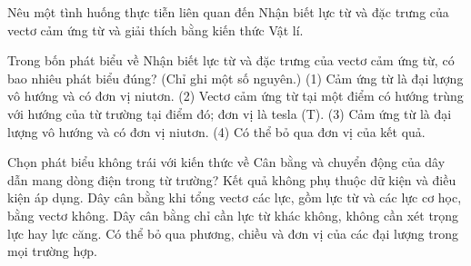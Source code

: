 \begin{bt}
Nêu một tình huống thực tiễn liên quan đến Nhận biết lực từ và đặc trưng của vectơ cảm ứng từ và giải thích bằng kiến thức Vật lí.
\end{bt}

\begin{ex}
Trong bốn phát biểu về Nhận biết lực từ và đặc trưng của vectơ cảm ứng từ, có bao nhiêu phát biểu đúng? (Chỉ ghi một số nguyên.) (1) Cảm ứng từ là đại lượng vô hướng và có đơn vị niutơn. (2) Vectơ cảm ứng từ tại một điểm có hướng trùng với hướng của từ trường tại điểm đó; đơn vị là tesla (T). (3) Cảm ứng từ là đại lượng vô hướng và có đơn vị niutơn. (4) Có thể bỏ qua đơn vị của kết quả.
\end{ex}

\begin{ex}
Chọn phát biểu không trái với kiến thức về Cân bằng và chuyển động của dây dẫn mang dòng điện trong từ trường?
\choice
{Kết quả không phụ thuộc dữ kiện và điều kiện áp dụng.}
{\True Dây cân bằng khi tổng vectơ các lực, gồm lực từ và các lực cơ học, bằng vectơ không.}
{Dây cân bằng chỉ cần lực từ khác không, không cần xét trọng lực hay lực căng.}
{Có thể bỏ qua phương, chiều và đơn vị của các đại lượng trong mọi trường hợp.}
\end{ex}

